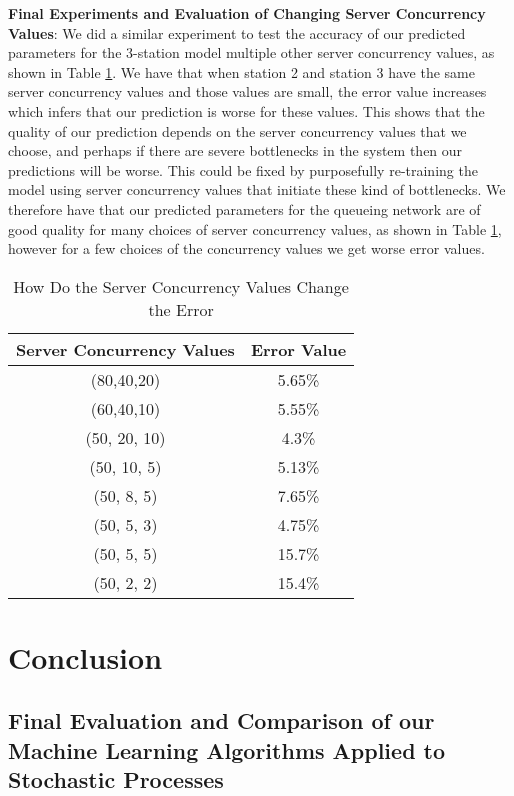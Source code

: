 \documentclass[a4paper,11pt,titlepage]{article}
\begin{document}
\textbf{Final Experiments and Evaluation of Changing Server Concurrency Values}: We did a similar experiment to test the accuracy of our predicted parameters for the 3-station model multiple other server concurrency values, as shown in Table \ref{tab:sc_acc}. We have that when station 2 and station 3 have the same server concurrency values and those values are small, the error value increases which infers that our prediction is worse for these values. This shows that the quality of our prediction depends on the server concurrency values that we choose, and perhaps if there are severe bottlenecks in the system then our predictions will be worse. This could be fixed by purposefully re-training the model using server concurrency values that initiate these kind of bottlenecks. We therefore have that our predicted parameters for the queueing network are of good quality for many choices of server concurrency values, as shown in Table \ref{tab:sc_acc}, however for a few choices of the concurrency values we get worse error values. 

\begin{table}[h!]
\begin{center}
\begin{tabular}{|c|c|}
\hline
\multicolumn{1}{|l|}{Server Concurrency Values} & \multicolumn{1}{l|}{Error Value} \\ \hline
(80,40,20) & 5.65\% \\ \hline
(60,40,10) & 5.55\% \\ \hline
(50, 20, 10) & 4.3\% \\ \hline
(50, 10, 5) & 5.13\% \\ \hline
(50, 8, 5) & 7.65\% \\ \hline
(50, 5, 3) & 4.75\% \\ \hline
(50, 5, 5) & 15.7\% \\ \hline
(50, 2, 2) & 15.4\% \\ \hline
\end{tabular}
\end{center}
\caption{How Do the Server Concurrency Values Change the Error}
\label{tab:sc_acc}
\end{table}

\section{Conclusion}

\subsection{Final Evaluation and Comparison of our Machine Learning Algorithms Applied to Stochastic Processes}
\end{document}
